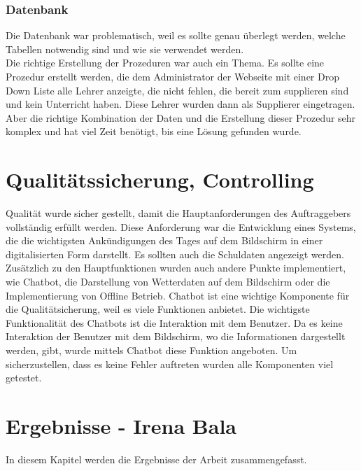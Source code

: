 \subsubsection{Datenbank}

Die Datenbank war problematisch, weil es sollte genau überlegt werden, welche Tabellen notwendig sind und wie sie verwendet werden. \\
Die richtige Erstellung der Prozeduren war auch ein Thema. Es sollte eine Prozedur erstellt werden, die dem Administrator der Webseite mit einer Drop Down Liste alle Lehrer anzeigte, die nicht fehlen, die bereit zum supplieren sind und kein Unterricht haben. Diese Lehrer wurden dann als Supplierer eingetragen. Aber die richtige Kombination der Daten und die Erstellung dieser Prozedur sehr komplex und hat viel Zeit benötigt, bis eine Lösung gefunden wurde. 

\section{Qualitätssicherung, Controlling}
Qualität wurde sicher gestellt, damit die Hauptanforderungen des Auftraggebers vollständig erfüllt werden. Diese Anforderung war die Entwicklung eines Systems, die die wichtigsten Ankündigungen des Tages auf dem Bildschirm in einer digitalisierten Form darstellt. Es sollten auch die Schuldaten angezeigt werden. \\
Zusätzlich zu den Hauptfunktionen wurden auch andere Punkte implementiert, wie Chatbot, die Darstellung von Wetterdaten auf dem Bildschirm oder die Implementierung von Offline Betrieb. Chatbot ist eine wichtige Komponente für die Qualitätsicherung, weil es viele Funktionen anbietet. Die wichtigste Funktionalit\"at des Chatbots ist die Interaktion mit dem Benutzer. Da es keine Interaktion der Benutzer mit dem Bildschirm, wo die Informationen dargestellt werden, gibt, wurde mittels Chatbot diese Funktion angeboten. 
Um sicherzustellen, dass es keine Fehler auftreten wurden alle Komponenten viel getestet.  

\section{Ergebnisse - Irena Bala}
In diesem Kapitel werden die Ergebnisse der Arbeit zusammengefasst.
